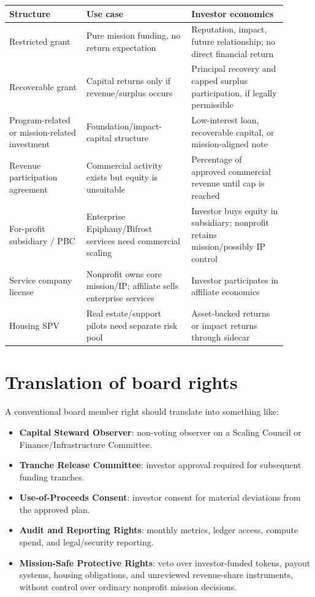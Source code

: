 \documentclass[11pt,oneside]{report}
\newcommand{\term}[1]{\textbf{#1}}
\begin{document}
\begin{longtable}{P{0.25\linewidth}P{0.34\linewidth}P{0.31\linewidth}}
\toprule
\textbf{Structure} & \textbf{Use case} & \textbf{Investor economics} \\
\midrule
Restricted grant & Pure mission funding, no return expectation & Reputation, impact, future relationship; no direct financial return \\
Recoverable grant & Capital returns only if revenue/surplus occurs & Principal recovery and capped surplus participation, if legally permissible \\
Program-related or mission-related investment & Foundation/impact-capital structure & Low-interest loan, recoverable capital, or mission-aligned note \\
Revenue participation agreement & Commercial activity exists but equity is unsuitable & Percentage of approved commercial revenue until cap is reached \\
For-profit subsidiary / PBC & Enterprise Epiphany/Bifrost services need commercial scaling & Investor buys equity in subsidiary; nonprofit retains mission/possibly IP control \\
Service company license & Nonprofit owns core mission/IP; affiliate sells enterprise services & Investor participates in affiliate economics \\
Housing SPV & Real estate/support pilots need separate risk pool & Asset-backed returns or impact returns through sidecar \\
\bottomrule
\end{longtable}

\section{Translation of board rights}

A conventional board member right should translate into something like:

\begin{itemize}
  \item \term{Capital Steward Observer}: non-voting observer on a Scaling Council or Finance/Infrastructure Committee.
  \item \term{Tranche Release Committee}: investor approval required for subsequent funding tranches.
  \item \term{Use-of-Proceeds Consent}: investor consent for material deviations from the approved plan.
  \item \term{Audit and Reporting Rights}: monthly metrics, ledger access, compute spend, and legal/security reporting.
  \item \term{Mission-Safe Protective Rights}: veto over investor-funded tokens, payout systems, housing obligations, and unreviewed revenue-share instruments, without control over ordinary nonprofit mission decisions.
\end{itemize}
\end{document}
